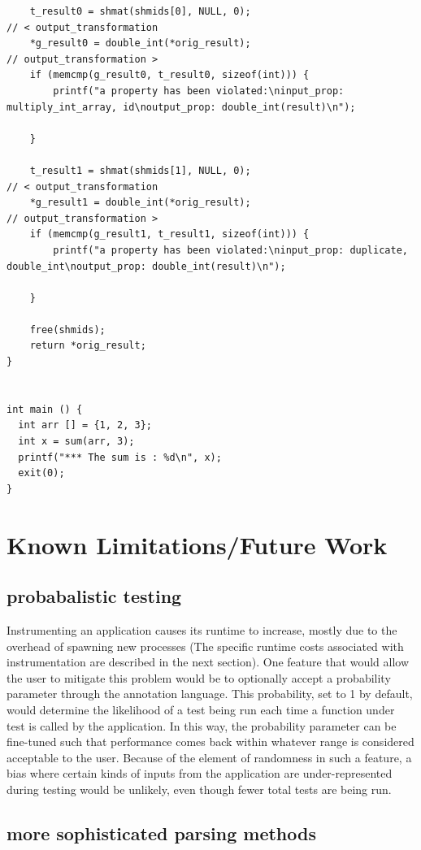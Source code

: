\documentclass[notitlepage]{article}
\begin{document}
\begin{verbatim}
    t_result0 = shmat(shmids[0], NULL, 0);
// < output_transformation
    *g_result0 = double_int(*orig_result);
// output_transformation >
    if (memcmp(g_result0, t_result0, sizeof(int))) {
        printf("a property has been violated:\ninput_prop: multiply_int_array, id\noutput_prop: double_int(result)\n");

    }

    t_result1 = shmat(shmids[1], NULL, 0);
// < output_transformation
    *g_result1 = double_int(*orig_result);
// output_transformation >
    if (memcmp(g_result1, t_result1, sizeof(int))) {
        printf("a property has been violated:\ninput_prop: duplicate, double_int\noutput_prop: double_int(result)\n");

    }

    free(shmids);
    return *orig_result;
}


int main () {
  int arr [] = {1, 2, 3};
  int x = sum(arr, 3);
  printf("*** The sum is : %d\n", x);
  exit(0);
}
\end{verbatim}

\section{Known Limitations/Future Work}

\subsection{probabalistic testing}

Instrumenting an application causes its runtime to increase, mostly due to the overhead of spawning new processes (The specific runtime costs associated with instrumentation are described in the next section). One feature that would allow the user to mitigate this problem would be to optionally accept a probability parameter through the annotation language. This probability, set to 1 by default, would determine the likelihood of a test being run each time a function under test is called by the application. In this way, the probability parameter can be fine-tuned such that performance comes back within whatever range is considered acceptable to the user. Because of the element of randomness in such a feature, a bias where certain kinds of inputs from the application are under-represented during testing would be unlikely, even though fewer total tests are being run.

\subsection{more sophisticated parsing methods}
\end{document}
